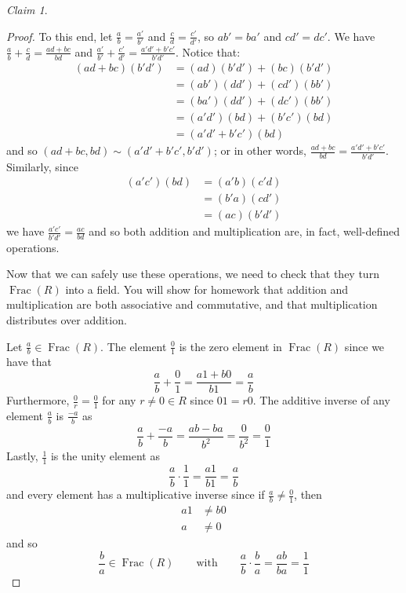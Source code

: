 \documentclass[12pt,letterpaper,DIV=11,final]{scrartcl}
\theoremstyle{plain}
\theoremstyle{definition}
\theoremstyle{remark}
\newtheorem{claim}{Claim}
\DeclareMathOperator{\Frac}{Frac}
\begin{document}
\begin{claim}
\begin{proof}
    To this end, let $\frac{a}{b} = \frac{a'}{b'}$ and $\frac{c}{d} = \frac{c'}{d'}$, so $ab' = ba'$ and $cd' = dc'$.
    We have $\frac{a}{b} + \frac{c}{d} = \frac{ad + bc}{bd}$ and $\frac{a'}{b'} + \frac{c'}{d'} = \frac{a'd' + b'c'}{b'd'}$.
    Notice that:
    \begin{align*}
      (ad + bc) (b' d') &= (a d) (b' d') + (b c) (b' d') \\
                        &= (a b') (d d') + (c d') (b b') \\
                        &= (b a') (d d') + (d c') (b b') \\
                        &= (a' d') (b d) + (b' c') (b d) \\
                        &= (a' d' + b' c') (b d)
    \end{align*}
    and so $(ad + bc, bd) \sim (a' d' + b' c', b' d')$; or in other words, $\frac{ad + bc}{bd} = \frac{a' d' + b' c'}{b' d'}$.
    Similarly, since
    \begin{align*}
      (a' c') (b d) &= (a' b) (c' d) \\
                    &= (b' a) (c d') \\
                    &= (a c) (b' d')
    \end{align*}
    we have $\frac{a' c'}{b' d'} = \frac{ac}{bd}$ and so both addition and multiplication are, in fact, well-defined operations.

    Now that we can safely use these operations, we need to check that they turn $\Frac(R)$ into a field.
    You will show for homework that addition and multiplication are both associative and commutative, and that multiplication distributes over addition.

    Let $\frac{a}{b} \in \Frac(R)$.
    The element $\frac{0}{1}$ is the zero element in $\Frac(R)$ since we have that
    \begin{displaymath}
      \frac{a}{b} + \frac{0}{1} = \frac{a1 + b0}{b1} = \frac{a}{b}
    \end{displaymath}
    Furthermore, $\frac{0}{r} = \frac{0}{1}$ for any $r \neq 0 \in R$ since $01 = r0$.
    The additive inverse of any element $\frac{a}{b}$ is $\frac{-a}{b}$ as
    \begin{displaymath}
      \frac{a}{b} + \frac{-a}{b} = \frac{ab - ba}{b^2} = \frac{0}{b^2} = \frac{0}{1}
    \end{displaymath}
    Lastly, $\frac{1}{1}$ is the unity element as
    \begin{displaymath}
      \frac{a}{b} \cdot \frac{1}{1} = \frac{a1}{b1} = \frac{a}{b}
    \end{displaymath}
    and every element has a multiplicative inverse since if $\frac{a}{b} \neq \frac{0}{1}$, then
    \begin{align*}
      a1 &\neq b0 \\
      a &\neq 0
    \end{align*}
    and so
    \begin{displaymath}
      \frac{b}{a} \in \Frac(R) \qquad \text{with} \qquad \frac{a}{b} \cdot \frac{b}{a} = \frac{ab}{ba} = \frac{1}{1}
    \end{displaymath}


\end{proof}
\end{claim}
\end{document}
